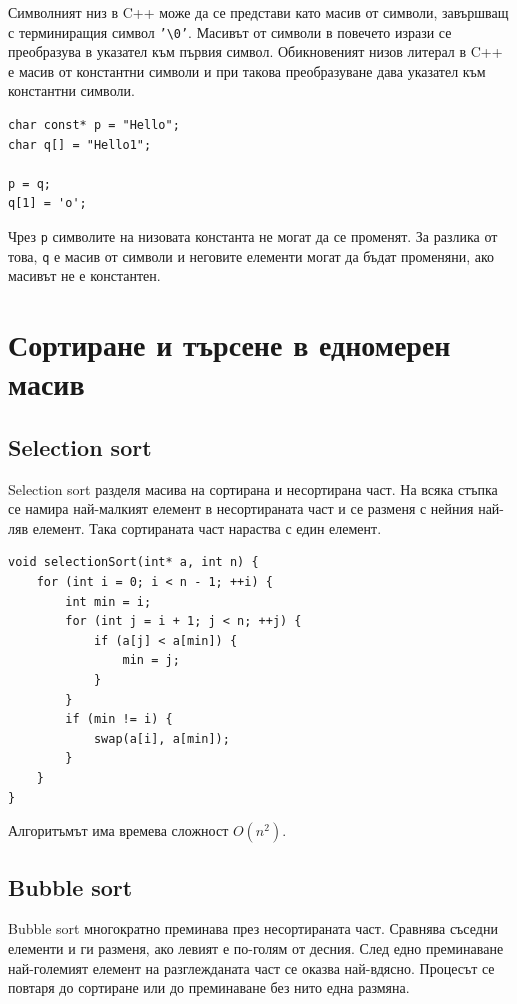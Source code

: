 \begin{defn}
Символният низ в C++ може да се представи като масив от символи, завършващ с терминиращия символ \texttt{'\textbackslash 0'}. Масивът от символи в повечето изрази се преобразува в указател към първия символ. Обикновеният низов литерал в C++ е масив от константни символи и при такова преобразуване дава указател към константни символи.
\end{defn}

\begin{verbatim}
char const* p = "Hello";
char q[] = "Hello1";

p = q;
q[1] = 'o';
\end{verbatim}

Чрез \texttt{p} символите на низовата константа не могат да се променят. За разлика от това, \texttt{q} е масив от символи и неговите елементи могат да бъдат променяни, ако масивът не е константен.

\section{Сортиране и търсене в едномерен масив}\label{s:15.5}

\subsection{Selection sort}\label{s:15.5.1}

Selection sort разделя масива на сортирана и несортирана част. На всяка стъпка се намира най-малкият елемент в несортираната част и се разменя с нейния най-ляв елемент. Така сортираната част нараства с един елемент.

\begin{verbatim}
void selectionSort(int* a, int n) {
    for (int i = 0; i < n - 1; ++i) {
        int min = i;
        for (int j = i + 1; j < n; ++j) {
            if (a[j] < a[min]) {
                min = j;
            }
        }
        if (min != i) {
            swap(a[i], a[min]);
        }
    }
}
\end{verbatim}

Алгоритъмът има времева сложност $O(n^2)$.

\subsection{Bubble sort}\label{s:15.5.2}

Bubble sort многократно преминава през несортираната част. Сравнява съседни елементи и ги разменя, ако левият е по-голям от десния. След едно преминаване най-големият елемент на разглежданата част се оказва най-вдясно. Процесът се повтаря до сортиране или до преминаване без нито една размяна.

